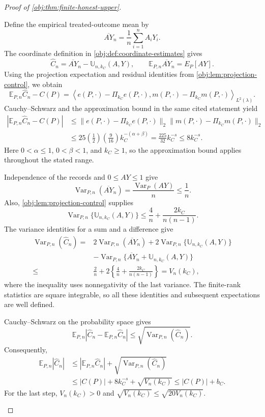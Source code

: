 \documentclass[11pt]{article}
\begin{document}
\begin{proof}[Proof of \cref{obj:thm:finite-honest-upper}]
\begin{enumerate}
Define the empirical treated-outcome mean by
\[
\overline{AY}_n=\frac1n\sum_{i=1}^n A_iY_i.
\]
The coordinate definition in \cref{obj:def:coordinate-estimates} gives
\[
\widehat C_n
=\overline{AY}_n-\mathbb U_{n,k_C}(A,Y),
\qquad
\mathbb E_{P,n}\overline{AY}_n=E_P[AY].
\]
Using the projection expectation and residual identities from
\cref{obj:lem:projection-control}, we obtain
\[
\mathbb E_{P,n}\widehat C_n-C(P)
=
\left\langle
e(P,\cdot)-\Pi_{k_C}e(P,\cdot),
m(P,\cdot)-\Pi_{k_C}m(P,\cdot)
\right\rangle_{L^2(\lambda)}.
\]
Cauchy--Schwarz and the approximation bound in the same cited statement yield
\[
\begin{aligned}
|\mathbb E_{P,n}\widehat C_n-C(P)|
&\le
\|e(P,\cdot)-\Pi_{k_C}e(P,\cdot)\|_2
\|m(P,\cdot)-\Pi_{k_C}m(P,\cdot)\|_2\\
&\le
25\left(\frac12\right)\left(\frac9{16}\right)
k_C^{-(\alpha+\beta)}
=\frac{225}{32}k_C^{-s}
\le8k_C^{-s}.
\end{aligned}
\]
Here \(0<\alpha\le1\), \(0<\beta<1\), and \(k_C\ge1\), so the approximation bound applies throughout the stated range.

Independence of the records and \(0\le AY\le1\) give
\[
\operatorname{Var}_{P,n}(\overline{AY}_n)
=\frac{\operatorname{Var}_P(AY)}n
\le\frac1n.
\]
Also, \cref{obj:lem:projection-control} supplies
\[
\operatorname{Var}_{P,n}\{\mathbb U_{n,k_C}(A,Y)\}
\le\frac4n+\frac{2k_C}{n(n-1)}.
\]
The variance identities for a sum and a difference give
\[
\begin{aligned}
\operatorname{Var}_{P,n}(\widehat C_n)
={}&2\operatorname{Var}_{P,n}(\overline{AY}_n)
+2\operatorname{Var}_{P,n}\{\mathbb U_{n,k_C}(A,Y)\}\\
&-\operatorname{Var}_{P,n}
 \{\overline{AY}_n+\mathbb U_{n,k_C}(A,Y)\}\\
\le{}&\frac2n+2\left\{\frac4n+\frac{2k_C}{n(n-1)}\right\}
=V_n(k_C),
\end{aligned}
\]
where the inequality uses nonnegativity of the last variance.
The finite-rank statistics are square integrable, so all these identities and subsequent expectations are well defined.

Cauchy--Schwarz on the probability space gives
\[
\mathbb E_{P,n}
\left|\widehat C_n-\mathbb E_{P,n}\widehat C_n\right|
\le
\sqrt{\operatorname{Var}_{P,n}(\widehat C_n)}.
\]
Consequently,
\[
\begin{aligned}
\mathbb E_{P,n}|\widehat C_n|
&\le
|\mathbb E_{P,n}\widehat C_n|
+\sqrt{\operatorname{Var}_{P,n}(\widehat C_n)}\\
&\le
|C(P)|+8k_C^{-s}+\sqrt{V_n(k_C)}
\le |C(P)|+b_C.
\end{aligned}
\]
For the last step, \(V_n(k_C)>0\) and
\(\sqrt{V_n(k_C)}\le\sqrt{20V_n(k_C)}\).


\end{enumerate}
\end{proof}
\end{document}
